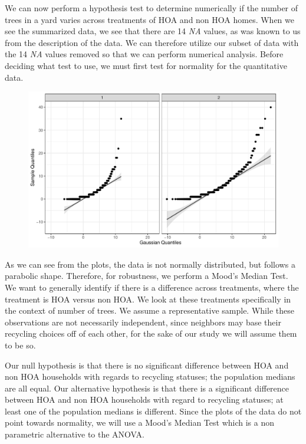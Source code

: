 \documentclass{article}
\begin{document}
We can now perform a hypothesis test to determine numerically if the number of trees in a yard varies across treatments of HOA and non HOA homes. When we see the summarized data, we see that there are 14 \textit{NA} values, as was known to us from the description of the data. We can therefore utilize our subset of data with the 14 \textit{NA} values removed so that we can perform numerical analysis. Before deciding what test to use, we must first test for normality for the quantitative data.
\newline
\begin{figure}[H]
		\centering
\includegraphics{exam23-022}
		\label{Fig:plot8}
	\end{figure}
As we can see from the plots\citep{qqplotr}, the data is not normally distributed, but follows a parabolic shape. Therefore, for robustness, we perform a Mood's Median Test\citep{RVAideMemoire}. We want to generally identify if there is a difference across treatments, where the treatment is HOA versus non HOA. We look at these treatments specifically in the context of number of trees. We assume a representative sample. While these observations are not necessarily independent, since neighbors may base their recycling choices off of each other, for the sake of our study we will assume them to be so.

Our null hypothesis is that there is no significant difference between HOA and non HOA households with regards to recycling statuses; the population medians are all equal. Our alternative hypothesis is that there is a significant difference between HOA and non HOA households with regard to recycling statuses; at least one of the population medians is different. Since the plots of the data do not point towards normality, we will use a Mood's Median Test which is a non parametric alternative to the ANOVA.
\end{document}
